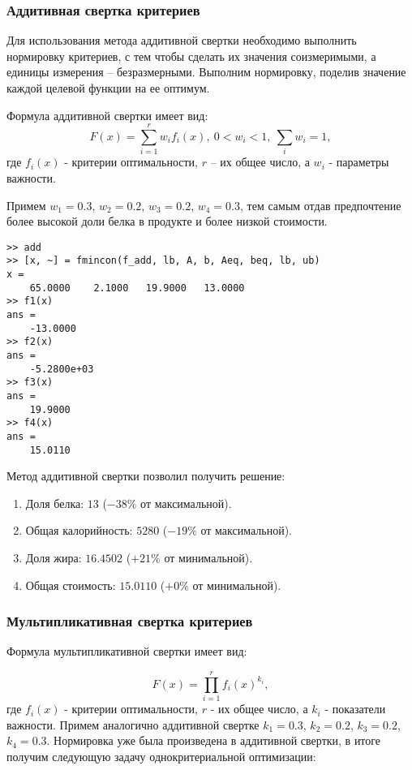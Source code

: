\subsubsection{Аддитивная свертка критериев}

Для использования метода аддитивной свертки необходимо выполнить нормировку критериев, с тем чтобы сделать их значения соизмеримыми, а единицы измерения – безразмерными. Выполним нормировку, поделив значение каждой целевой функции на ее оптимум.

Формула аддитивной свертки имеет вид:
$$
F(x) = \sum_{i=1}^{r}w_i f_i(x),\ 0<w_i<1,\ \sum_i w_i=1,
$$
где $f_i(x)$ - критерии оптимальности, $r$ – их общее число, а $w_i$ - параметры важности. 

Примем $w_1 = 0.3$, $w_2 = 0.2$, $w_3 = 0.2$, $w_4 = 0.3$, тем самым отдав предпочтение более высокой доли белка в продукте и более низкой стоимости.





\begin{lstlisting}[caption=\code{Console}]
>> add
>> [x, ~] = fmincon(f_add, lb, A, b, Aeq, beq, lb, ub)
x = 
	65.0000    2.1000   19.9000   13.0000
>> f1(x)
ans =
	-13.0000
>> f2(x)
ans =
	-5.2800e+03
>> f3(x)
ans =
	19.9000
>> f4(x)
ans =
	15.0110

\end{lstlisting}

Метод аддитивной свертки позволил получить решение:

\begin{enumerate}
	\item Доля белка: $13$ ($-38\%$ от максимальной).
	\item Общая калорийность: $5280$ ($-19\%$ от максимальной).
	\item Доля жира: $16.4502$ ($+21\%$ от минимальной).
	\item Общая стоимость: $15.0110$ ($+0\%$ от минимальной).
\end{enumerate}

\subsubsection{Мультипликативная свертка критериев}

Формула мультипликативной свертки имеет вид:

$$
F(x) = \prod_{i=1}^{r} f_i(x)^{k_i},
$$
где $f_i(x)$ - критерии оптимальности, $r$ - их общее число, а $k_i$ - показатели важности. Примем аналогично аддитивной свертке $k_1 = 0.3$, $k_2 = 0.2$, $k_3 = 0.2$, $k_4 = 0.3$. Нормировка уже была произведена в аддитивной свертки, в итоге получим следующую задачу однокритериальной оптимизации:

